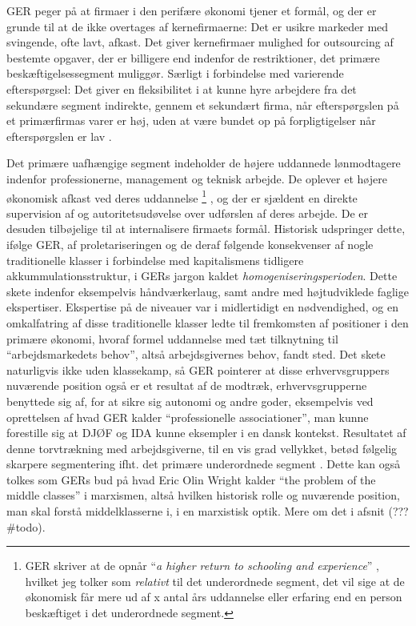 GER peger på at firmaer i den perifære økonomi tjener et formål, og der er grunde til at de ikke overtages af kernefirmaerne: Det er usikre markeder med svingende, ofte lavt, afkast. Det giver kernefirmaer mulighed for outsourcing af bestemte opgaver, der er billigere end indenfor de restriktioner, det primære beskæftigelsessegment muliggør. Særligt i forbindelse med varierende efterspørgsel: Det giver en fleksibilitet i at kunne hyre arbejdere fra det sekundære segment indirekte, gennem et sekundært firma, når efterspørgslen på et primærfirmas varer er høj, uden at være bundet op på forpligtigelser når efterspørgslen er lav \parencite[191]{Gordon1982}. 

Det primære uafhængige segment \label{GER kontrol og intern arb marked} indeholder de højere uddannede lønmodtagere indenfor professionerne, management og teknisk arbejde. De oplever et højere økonomisk afkast ved deres uddannelse%
% 
\footnote{GER skriver at de opnår “\emph{a higher return to schooling and experience}” \parencite[202]{Gordon1982}, hvilket jeg tolker som \emph{relativt} til det underordnede segment, det vil sige at de økonomisk får mere ud af x antal års uddannelse eller erfaring end en person beskæftiget i det underordnede segment.}%
%
, og der er sjældent en direkte supervision af og autoritetsudøvelse over udførslen af deres arbejde. De er desuden tilbøjelige til at internalisere firmaets formål. 
Historisk udspringer dette, ifølge GER, af proletariseringen og de deraf følgende konsekvenser af nogle traditionelle klasser i forbindelse med kapitalismens tidligere akkummulationsstruktur, i GERs jargon kaldet \emph{homogeniseringsperioden}.  Dette skete indenfor eksempelvis håndværkerlaug, samt andre med højtudviklede faglige ekspertiser. Ekspertise på de niveauer var i midlertidigt en nødvendighed, og en omkalfatring af disse traditionelle klasser ledte til fremkomsten af positioner i den primære økonomi, hvoraf formel uddannelse med tæt tilknytning til “arbejdsmarkedets behov”, altså arbejdsgivernes behov, fandt sted. Det skete naturligvis ikke uden klassekamp, så GER pointerer at disse erhvervsgruppers nuværende position også er et resultat af de modtræk, erhvervsgrupperne benyttede sig af, for at sikre sig autonomi og andre goder, eksempelvis ved oprettelsen af hvad GER kalder “professionelle associationer”, man kunne forestille sig at DJØF og IDA kunne eksempler i en dansk kontekst. Resultatet af denne torvtrækning med arbejdsgiverne, til en vis grad vellykket, betød følgelig skarpere segmentering ifht. det primære underordnede segment \parencite[202f]{Gordon1982}.
Dette kan også tolkes som GERs bud på hvad Eric Olin Wright kalder “the problem of the middle classes” i marxismen, altså hvilken historisk rolle og nuværende position, man skal forstå middelklasserne i, i en marxistisk optik. Mere om det i afsnit (??? \#todo).


